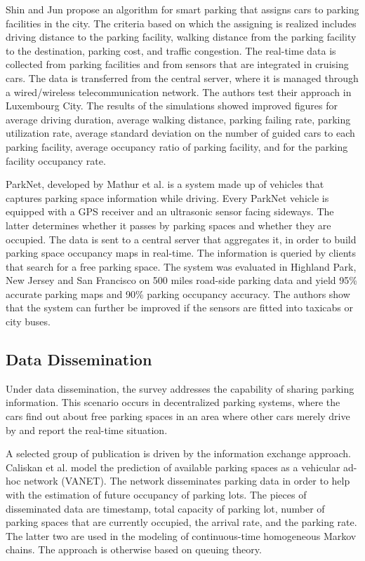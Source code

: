 	Shin and Jun\cite{shin} propose an algorithm for smart parking that assigns cars to parking facilities in the city. The criteria based on which the assigning is realized includes driving distance to the parking facility, walking distance from the parking facility to the destination, parking cost, and traffic congestion. The real-time data is collected from parking facilities and from sensors that are integrated in cruising cars. The data is transferred from the central server, where it is managed through a wired/wireless telecommunication network. The authors test their approach in Luxembourg City. The results of the simulations showed improved figures for average driving duration, average walking distance, parking failing rate, parking utilization rate, average standard deviation on the number of guided cars to each parking facility, average occupancy ratio of parking facility, and for the parking facility occupancy rate. 
	
	ParkNet, developed by Mathur et al.\cite{mathur} is a system made up of vehicles that captures parking space information while driving. Every ParkNet vehicle is equipped with a GPS receiver and an ultrasonic sensor facing sideways. The latter determines whether it passes by parking spaces and whether they are occupied. The data is sent to a central server that aggregates it, in order to build parking space occupancy maps in real-time. The information is queried by clients that search for a free parking space. The system was evaluated in Highland Park, New Jersey and San Francisco on 500 miles road-side parking data and yield 95\% accurate parking maps and 90\% parking occupancy accuracy. The authors show that the system can further be improved if the sensors are fitted into taxicabs or city buses.
	
	\subsection{Data Dissemination}
	Under data dissemination, the survey addresses the capability of sharing parking information. This scenario occurs in decentralized parking systems, where the cars find out about free parking spaces in an area where other cars merely drive by and report the real-time situation. 
	
	A selected group of publication is driven by the information exchange approach. Caliskan et al.\cite{caliskan} model the prediction of available parking spaces as a vehicular ad-hoc network (VANET). The network disseminates parking data in order to help with the estimation of future occupancy of parking lots. The pieces of disseminated data are timestamp, total capacity of parking lot, number of parking spaces that are currently occupied, the arrival rate, and the parking rate. The latter two are used in the modeling of continuous-time homogeneous Markov chains. The approach is otherwise based on queuing theory. 
	
